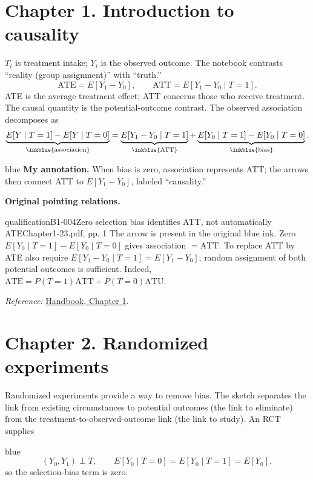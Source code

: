 {\color{black}
\section{Chapter 1. Introduction to causality}
$T_i$ is treatment intake; $Y_i$ is the observed outcome. The notebook contrasts ``reality (group assignment)'' with ``truth.''
\[
\mathrm{ATE}=E[Y_1-Y_0],\qquad \mathrm{ATT}=E[Y_1-Y_0\mid T=1].
\]
ATE is the average treatment effect; ATT concerns those who receive treatment. The causal quantity is the potential-outcome contrast. The observed association decomposes as
\[
\underbrace{E[Y\mid T=1]-E[Y\mid T=0]}_{\inkblue{\text{association}}}
=\underbrace{E[Y_1-Y_0\mid T=1]}_{\inkblue{\mathrm{ATT}}}
+\underbrace{E[Y_0\mid T=1]-E[Y_0\mid T=0]}_{\inkblue{\text{bias}}}.
\]
\begin{inkblock}{blue}
\textbf{My annotation.} When bias is zero, association represents ATT; the arrows then connect ATT to $E[Y_1-Y_0]$, labeled ``causality.''
\end{inkblock}

\par{}\smallskip\textbf{Original pointing relations.}\par\smallskip
{}
\begin{reviewnote}{qualification}{B1-004}{Zero selection bias identifies ATT, not automatically ATE}{Chapter1-23.pdf, pp. 1}
The arrow is present in the original blue ink. Zero $E[Y_0\mid T=1]-E[Y_0\mid T=0]$ gives association $=\mathrm{ATT}$. To replace ATT by ATE also require $E[Y_1-Y_0\mid T=1]=E[Y_1-Y_0]$; random assignment of both potential outcomes is sufficient. Indeed, $\mathrm{ATE}=P(T=1)\mathrm{ATT}+P(T=0)\mathrm{ATU}$.
\par\smallskip\textit{Reference:} \href{https://matheusfacure.github.io/python-causality-handbook/01-Introduction-To-Causality.html}{Handbook, Chapter 1}.
\end{reviewnote}
\section{Chapter 2. Randomized experiments}
Randomized experiments provide a way to remove bias. The sketch separates the link from existing circumstances to potential outcomes (the link to eliminate) from the treatment-to-observed-outcome link (the link to study). An RCT supplies
\begin{inkblock}{blue}
\[
(Y_0,Y_1)\perp T,\qquad E[Y_0\mid T=0]=E[Y_0\mid T=1]=E[Y_0],
\]
so the selection-bias term is zero.
\end{inkblock}

}
